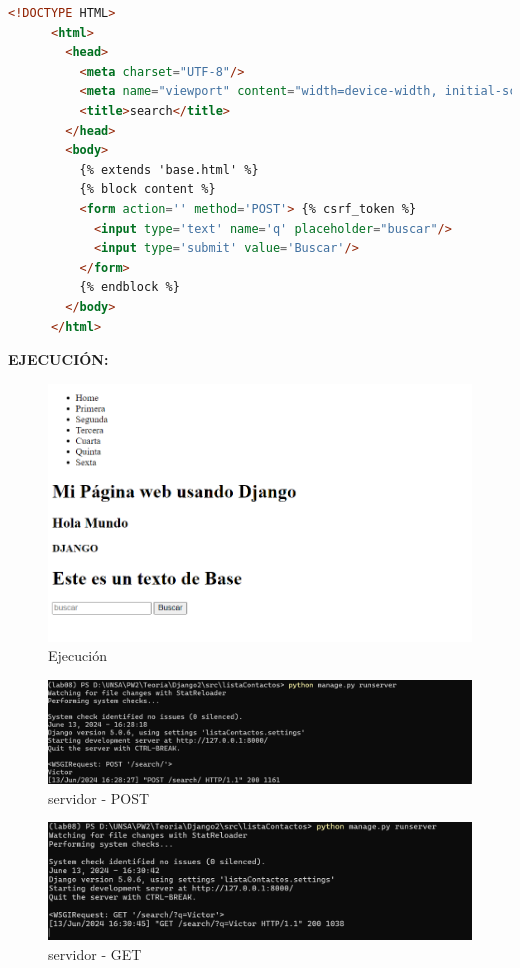 \documentclass{article}
\begin{document}
    \begin{lstlisting}[language=html]
      <!DOCTYPE HTML>
      <html>
        <head>
          <meta charset="UTF-8"/>
          <meta name="viewport" content="width=device-width, initial-scale=1.0"/>
          <title>search</title>
        </head>
        <body>
          {% extends 'base.html' %}
          {% block content %}
          <form action='' method='POST'> {% csrf_token %}
            <input type='text' name='q' placeholder="buscar"/>
            <input type='submit' value='Buscar'/>
          </form>
          {% endblock %}
        </body>
      </html>
    \end{lstlisting}
    \textbf{EJECUCIÓN: }
    \begin{figure}[H]
      \centering
      \includegraphics[width=1\textwidth, keepaspectratio]{img/ejecucion4.png}
      \caption{Ejecución}
    \end{figure}
    \begin{figure}[H]
      \centering
      \includegraphics[width=1\textwidth, keepaspectratio]{img/post.png}
      \caption{servidor - POST}
    \end{figure}
    \begin{figure}[H]
      \centering
      \includegraphics[width=1\textwidth, keepaspectratio]{img/get.png}
      \caption{servidor - GET}
    \end{figure}
  
\end{document}
